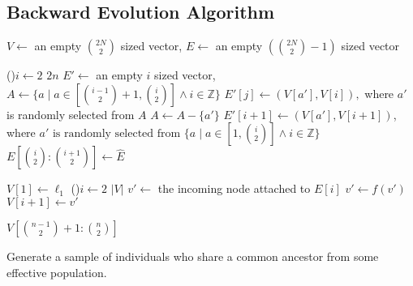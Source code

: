 \subsection{Backward Evolution Algorithm}\label{subsec:backwardEvolutionAlgorithm}
\begin{algorithm}[t]
    \SetAlgoLined
    \DontPrintSemicolon
     {
        $V \gets $ an empty $\binom{2N}{2}$ sized vector,
        $E \gets $ an empty $(\binom{2N}{2} - 1)$ sized vector \;

        \For(){$i \gets 2$ \KwTo $2n$} {
            $E' \gets $ an empty $i$ sized vector,
            $A \gets \{ a \mid a \in [\binom{i - 1}{2} + 1, \binom{i}{2}] \land i \in \mathbb{Z} \}$ \;
             {
                $E'[j] \gets (V[a'], V[i]),$ where $a'$ is randomly selected from $A$ \;
                $A \gets A - \{ a' \}$ \;
            }
            $E'[i + 1] \gets (V[a'], V[i + 1])$, where $ a' \text{ is randomly selected from } \{ a \mid a \in
            [1, \binom{i}{2}] \land i \in \mathbb{Z} \}$ \; \label{algline:coalescentEvent}
            $E[\binom{i}{2}:\binom{i + 1}{2}] \gets \hat{E}$ \;
        }

        $V[1] \gets \ell_1$ \;
        \For(){$i \gets 2$ \KwTo $| V |$} {
            $v' \gets $ the incoming node attached to $E[i]$ \;
             {
                $v' \gets f(v')$ \;
            }
            $V[i + 1] \gets v'$ \;
        }

        \Return $V[\binom{n - 1}{2} + 1:\binom{n}{2}]$ \;
    }
    \caption{Generate a sample of individuals who share a common ancestor from some effective population.}
    \label{alg:twoStageBackwardEvolution}
\end{algorithm}

